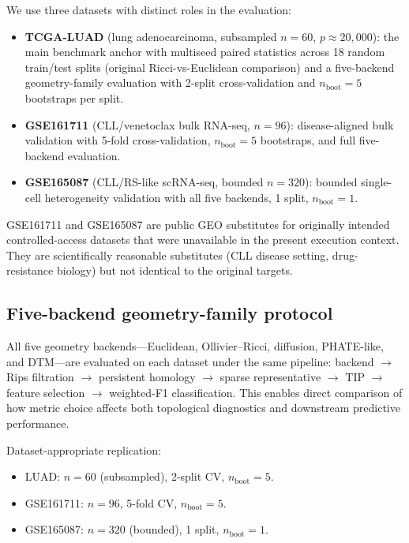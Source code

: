 \documentclass[11pt]{article}
\begin{document}
We use three datasets with distinct roles in the evaluation:
\begin{itemize}[leftmargin=1.5em]
\item \textbf{TCGA-LUAD} (lung adenocarcinoma, subsampled $n = 60$, $p \approx 20{,}000$): the main benchmark anchor with multiseed paired statistics across 18 random train/test splits (original Ricci-vs-Euclidean comparison) and a five-backend geometry-family evaluation with 2-split cross-validation and $n_{\text{boot}} = 5$ bootstraps per split.
\item \textbf{GSE161711} (CLL/venetoclax bulk RNA-seq, $n = 96$): disease-aligned bulk validation with 5-fold cross-validation, $n_{\text{boot}} = 5$ bootstraps, and full five-backend evaluation.
\item \textbf{GSE165087} (CLL/RS-like scRNA-seq, bounded $n = 320$): bounded single-cell heterogeneity validation with all five backends, 1 split, $n_{\text{boot}} = 1$.
\end{itemize}

GSE161711 and GSE165087 are public GEO substitutes for originally intended controlled-access datasets that were unavailable in the present execution context.
They are scientifically reasonable substitutes (CLL disease setting, drug-resistance biology) but not identical to the original targets.

\subsection{Five-backend geometry-family protocol}

All five geometry backends---Euclidean, Ollivier--Ricci, diffusion, PHATE-like, and DTM---are evaluated on each dataset under the same pipeline: backend $\to$ Rips filtration $\to$ persistent homology $\to$ sparse representative $\to$ TIP $\to$ feature selection $\to$ weighted-F1 classification.
This enables direct comparison of how metric choice affects both topological diagnostics and downstream predictive performance.

Dataset-appropriate replication:
\begin{itemize}[leftmargin=1.5em]
\item LUAD: $n = 60$ (subsampled), 2-split CV, $n_{\text{boot}} = 5$.
\item GSE161711: $n = 96$, 5-fold CV, $n_{\text{boot}} = 5$.
\item GSE165087: $n = 320$ (bounded), 1 split, $n_{\text{boot}} = 1$.
\end{itemize}
\end{document}
